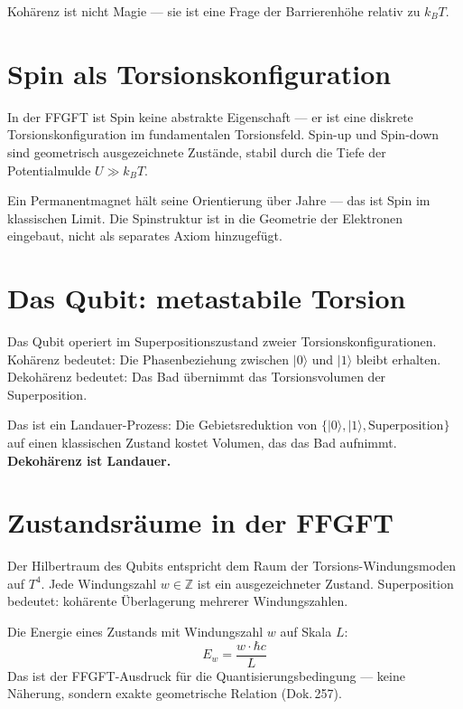 \label{ch:qubit}

\epigraph{Kohärenz ist nicht Magie --- sie ist eine Frage der
Barrierenhöhe relativ zu $k_BT$.}{}

\section{Spin als Torsionskonfiguration}

In der FFGFT ist Spin keine abstrakte Eigenschaft --- er ist eine diskrete
Torsionskonfiguration im fundamentalen Torsionsfeld. Spin-up und Spin-down
sind geometrisch ausgezeichnete Zustände, stabil durch die Tiefe der
Potentialmulde $U \gg k_BT$. 

\begin{laierspur}
Ein Permanentmagnet hält seine Orientierung über Jahre --- das ist Spin
im klassischen Limit. Die Spinstruktur ist in die Geometrie der Elektronen
eingebaut, nicht als separates Axiom hinzugefügt.
\end{laierspur}

\section{Das Qubit: metastabile Torsion}

Das Qubit operiert im Superpositionszustand zweier Torsionskonfigurationen.
Kohärenz bedeutet: Die Phasenbeziehung zwischen $|0\rangle$ und $|1\rangle$
bleibt erhalten. Dekohärenz bedeutet: Das Bad übernimmt das Torsionsvolumen
der Superposition. 

Das ist ein Landauer-Prozess: Die Gebietsreduktion von $\{|0\rangle,
|1\rangle, \text{Superposition}\}$ auf einen klassischen Zustand kostet
Volumen, das das Bad aufnimmt. \textbf{Dekohärenz ist Landauer.} 

\section{Zustandsräume in der FFGFT}

Der Hilbertraum des Qubits entspricht dem Raum der Torsions-Windungsmoden
auf $T^4$. Jede Windungszahl $w \in \mathbb{Z}$ ist ein ausgezeichneter
Zustand. Superposition bedeutet: kohärente Überlagerung mehrerer
Windungszahlen.

Die Energie eines Zustands mit Windungszahl $w$ auf Skala $L$:
\[
  E_w = \frac{w \cdot \hbar c}{L}
\]
Das ist der FFGFT-Ausdruck für die Quantisierungsbedingung --- keine
Näherung, sondern exakte geometrische Relation (Dok.\,257). 
